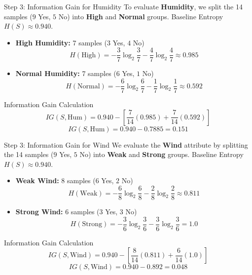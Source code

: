 \documentclass[aspectratio=169]{beamer}
\begin{document}
\begin{frame}{Step 3: Information Gain for Humidity}
    \footnotesize
    To evaluate \textbf{Humidity}, we split the 14 samples ($9$ Yes, $5$ No) into \textbf{High} and \textbf{Normal} groups.
    Baseline Entropy $H(S) \approx 0.940$.

    \begin{itemize}
        \item \textbf{High Humidity:} 7 samples ($3$ Yes, $4$ No)
        \[ H(\text{High}) = -\frac{3}{7}\log_2\frac{3}{7} - \frac{4}{7}\log_2\frac{4}{7} \approx 0.985 \]
        \item \textbf{Normal Humidity:} 7 samples ($6$ Yes, $1$ No)
        \[ H(\text{Normal}) = -\frac{6}{7}\log_2\frac{6}{7} - \frac{1}{7}\log_2\frac{1}{7} \approx 0.592 \]
    \end{itemize}

    \begin{block}{Information Gain Calculation}
        \[ IG(S, \text{Hum}) = 0.940 - \left[ \frac{7}{14}(0.985) + \frac{7}{14}(0.592) \right] \]
        \[ IG(S, \text{Hum}) = 0.940 - 0.7885 = \mathbf{0.151} \]
    \end{block}
\end{frame}

\begin{frame}{Step 3: Information Gain for Wind}
    \footnotesize
    We evaluate the \textbf{Wind} attribute by splitting the 14 samples ($9$ Yes, $5$ No) into \textbf{Weak} and \textbf{Strong} groups.
    Baseline Entropy $H(S) \approx 0.940$.

    \begin{itemize}
        \item \textbf{Weak Wind:} 8 samples ($6$ Yes, $2$ No)
        \[ H(\text{Weak}) = -\frac{6}{8}\log_2\frac{6}{8} - \frac{2}{8}\log_2\frac{2}{8} \approx 0.811 \]
        \item \textbf{Strong Wind:} 6 samples ($3$ Yes, $3$ No)
        \[ H(\text{Strong}) = -\frac{3}{6}\log_2\frac{3}{6} - \frac{3}{6}\log_2\frac{3}{6} = 1.0 \]
    \end{itemize}

    \begin{block}{Information Gain Calculation}
        \[ IG(S, \text{Wind}) = 0.940 - \left[ \frac{8}{14}(0.811) + \frac{6}{14}(1.0) \right] \]
        \[ IG(S, \text{Wind}) = 0.940 - 0.892 = \mathbf{0.048} \]
    \end{block}
\end{frame}
\end{document}
